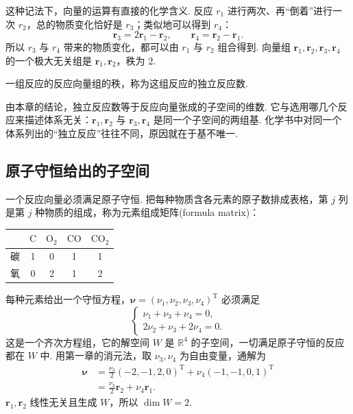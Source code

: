 \documentclass[lang=cn,10.5pt,scheme=chinese,toc=twocol,section,chinesefont=nofont,
twoside,citestyle=gb7714-2015,bibstyle=gb7714-2015]{elegantbook}
\DeclareRobustCommand{\textbf}[1]{{\lnsemiboldlatin\lnsemiboldcjk #1}}
\newcommand{\vv}[1]{\boldsymbol{#1}}
\newcommand{\trans}{\mathrm{T}}             %
\numberwithin{equation}{section}   %
\begin{document}
这种记法下，向量的运算有直接的化学含义. 反应 $r_1$ 进行两次、再“倒着”进行一次 $r_2$，总的物质变化恰好是 $r_3$；类似地可以得到 $r_4$：
\[
  \vv r_3=2\vv r_1-\vv r_2,\qquad \vv r_4=\vv r_2-\vv r_1.
\]
所以 $r_3$ 与 $r_4$ 带来的物质变化，都可以由 $r_1$ 与 $r_2$ 组合得到. 向量组 $\vv r_1,\vv r_2,\vv r_3,\vv r_4$ 的一个极大无关组是 $\vv r_1,\vv r_2$，秩为 $2$.

\begin{definition}
  一组反应的反应向量组的秩，称为这组反应的\textbf{独立反应数}.
\end{definition}

由本章的结论，独立反应数等于反应向量张成的子空间的维数. 它与选用哪几个反应来描述体系无关：$\vv r_1,\vv r_2$ 与 $\vv r_3,\vv r_4$ 是同一个子空间的两组基. 化学书中对同一个体系列出的“独立反应”往往不同，原因就在于基不唯一.

\subsection{原子守恒给出的子空间}

一个反应向量必须满足原子守恒. 把每种物质含各元素的原子数排成表格，第 $j$ 列是第 $j$ 种物质的组成，称为\textbf{元素组成矩阵}(formula matrix)：
\begin{center}
  \begin{tabular}{c|cccc}
      & $\mathrm{C}$ & $\mathrm{O_2}$ & $\mathrm{CO}$ & $\mathrm{CO_2}$ \\
    \hline
    碳 & 1            & 0              & 1             & 1               \\
    氧 & 0            & 2              & 1             & 2
  \end{tabular}
\end{center}
每种元素给出一个守恒方程，$\vv\nu=(\nu_1,\nu_2,\nu_3,\nu_4)^\trans$ 必须满足
\[
  \left\{
  \begin{array}{l}
    \nu_1+\nu_3+\nu_4=0, \\
    2\nu_2+\nu_3+2\nu_4=0.
  \end{array}
  \right.
\]
这是一个齐次方程组，它的解空间 $W$ 是 $\mathbb{R}^4$ 的子空间，\textbf{一切满足原子守恒的反应都在 $W$ 中}. 用第一章的消元法，取 $\nu_3,\nu_4$ 为自由变量，通解为
\[
  \begin{aligned}
    \vv\nu & =\frac{\nu_3}{2}(-2,-1,2,0)^\trans+\nu_4(-1,-1,0,1)^\trans \\
           & =\frac{\nu_3}{2}\vv r_2+\nu_4\vv r_1.
  \end{aligned}
\]
$\vv r_1,\vv r_2$ 线性无关且生成 $W$，所以 $\dim W=2$.
\end{document}
